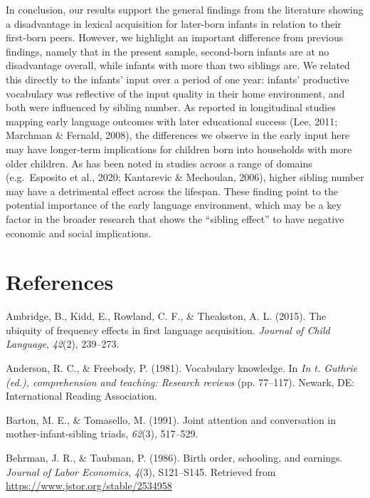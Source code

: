 \documentclass[
  english,
  man,floatsintext]{apa6}
\begin{document}
In conclusion, our results support the general findings from the literature showing a disadvantage in lexical acquisition for later-born infants in relation to their first-born peers. However, we highlight an important difference from previous findings, namely that in the present sample, second-born infants are at no disadvantage overall, while infants with more than two siblings are. We related this directly to the infants' input over a period of one year: infants' productive vocabulary was reflective of the input quality in their home environment, and both were influenced by sibling number. As reported in longitudinal studies mapping early language outcomes with later educational success (Lee, 2011; Marchman \& Fernald, 2008), the differences we observe in the early input here may have longer-term implications for children born into households with more older children. As has been noted in studies across a range of domains (e.g.~Esposito et al., 2020; Kantarevic \& Mechoulan, 2006), higher sibling number may have a detrimental effect across the lifespan. These finding point to the potential importance of the early language environment, which may be a key factor in the broader research that shows the \enquote{sibling effect} to have negative economic and social implications.

\newpage

\hypertarget{references}{%
\section{References}\label{references}}

\begingroup
\setlength{\parindent}{-0.5in}
\setlength{\leftskip}{0.5in}

\hypertarget{refs}{}
\leavevmode\hypertarget{ref-ambridge_ubiquity_2015}{}%
Ambridge, B., Kidd, E., Rowland, C. F., \& Theakston, A. L. (2015). The ubiquity of frequency effects in first language acquisition. \emph{Journal of Child Language}, \emph{42}(2), 239--273.

\leavevmode\hypertarget{ref-anderson_vocabulary_1981}{}%
Anderson, R. C., \& Freebody, P. (1981). Vocabulary knowledge. In \emph{In t. Guthrie (ed.), comprehension and teaching: Research reviews} (pp. 77--117). Newark, DE: International Reading Association.

\leavevmode\hypertarget{ref-barton_joint_1991}{}%
Barton, M. E., \& Tomasello, M. (1991). Joint attention and conversation in mother-infant-sibling triads, \emph{62}(3), 517--529.

\leavevmode\hypertarget{ref-behrman_birth_1986}{}%
Behrman, J. R., \& Taubman, P. (1986). Birth order, schooling, and earnings. \emph{Journal of Labor Economics}, \emph{4}(3), S121--S145. Retrieved from \url{https://www.jstor.org/stable/2534958}
\end{document}
